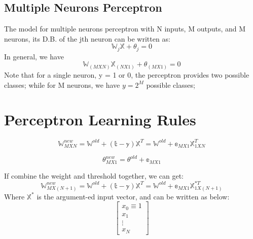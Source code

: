 \subsection{Multiple Neurons Perceptron}
The model for multiple neurons perceptron with N inputs, M outputs, and M neurons, its D.B. of the jth neuron can be written as:
\begin{equation}
 \mathbb{W}_j\mathbb{X}+\theta_j = 0   
\end{equation}
In general, we have 
\begin{equation}
 \mathbb{W}_{(MXN)}\mathbb{X}_{(NX1)}+\theta_{(MX1)} = 0   
\end{equation}
Note that for a single neuron, y = 1 or 0, the perceptron provides two possible classes; while for M neurons, we have $y = 2^{M}$ possible classes;


\noindent{\color{red} \rule{\linewidth}{0.5mm}}
\section{Perceptron Learning Rules}

\[\mathbb{W}_{MXN}^{new} = {\mathbb{W}^{old}} + (\mathbb{t} - \mathbb{y}){\mathbb{X}^T} = {\mathbb{W}^{old}} + {\mathbb{e}_{MX1}}\mathbb{X}_{1XN}^T\]

\[\mathbb{\theta}_{MX1}^{new} = {\mathbb{\theta}^{old}} + {\mathbb{e}_{MX1}}\]

If combine the weight and threshold together, we can get:
\[\mathbb{W}_{MX(N+1)}^{new} = {\mathbb{W}^{old}} + (\mathbb{t} - \mathbb{y}){\mathbb{X}^T} = {\mathbb{W}^{old}} + {\mathbb{e}_{MX1}}\mathbb{X}_{1X(N+1)}^{*T}\]
Where $\mathbb{X}^{*}$ is the argument-ed input vector, and can be written as below:
\[\left[ {\begin{array}{*{20}{c}}
{{x_0} \equiv 1}\\
{{x_1}}\\
 \vdots \\
{{x_N}}
\end{array}} \right]\]

